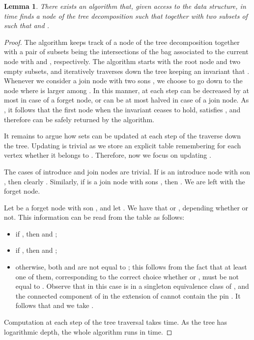 \documentclass[a4paper,11pt]{article}
\newtheorem{lemma}{Lemma}[section]
\theoremstyle{definition}
\theoremstyle{remark}
\begin{document}
\begin{lemma}\label{lem:tracing}
  There exists an algorithm that, given access to the data structure,
  in  time finds a node  of the tree
  decomposition such that 
  together with two subsets  of  such that  and .
\end{lemma}
\begin{proof}
  The algorithm keeps track of a node  of the tree decomposition
  together with a pair of subsets 
  being the intersections of the bag associated to the current node
  with  and , respectively.  The algorithm starts with the root
  node  and two empty subsets, and iteratively traverses down the
  tree keeping an invariant that .
  Whenever we consider a join node  with two sons , we
  choose to go down to the node where 
  is larger among .  In this manner, at each step
   can be decreased by at most  in case of a
  forget node, or can be at most halved in case of a join node.  As
  , it follows that the first node  when the
  invariant  ceases to hold, satisfies
  , and therefore
  can be safely returned by the algorithm.
  
  It remains to argue how sets  can be updated at each step
  of the traverse down the tree.  Updating  is trivial as we
  store an explicit table remembering for each vertex whether it
  belongs to .  Therefore, now we focus on updating .
  
  The cases of introduce and join nodes are trivial.  If  is an
  introduce node with son , then clearly .
  Similarly, if  is a join node with sons , then
  .  We are left with the forget node.
  
  Let  be a forget node with son , and let .  We
  have that  or , depending whether  or not.  This information can be read from the table  as
  follows:
  \begin{itemize}
  \item if , then  and ;
  \item if , then  and ;
  \item otherwise, both  and 
    are not equal to ; this follows from the fact that at least
    one of them, corresponding to the correct choice whether 
    or , must be not equal to .  Observe that in this
    case  is in a singleton equivalence class of , and the connected component of  in the extension
    of  cannot contain the pin .  It follows that
     and we take .
  \end{itemize}
  
  Computation at each step of the tree traversal takes 
  time.  As the tree has logarithmic depth, the whole algorithm runs
  in  time.
\end{proof}
\end{document}
